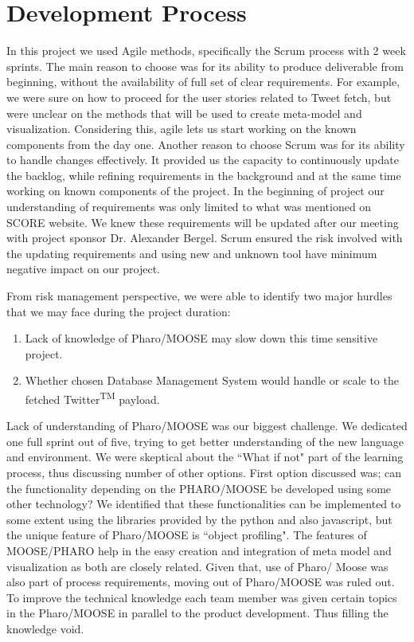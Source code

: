\documentclass[11pt]{article}
\begin{document}
\section{Development Process}

In this project we used Agile methods\cite{AGILEMANIFESTO}, specifically the Scrum process with 2 week sprints\cite{BlackAgilebook}. The main reason to choose was for its ability to produce deliverable from beginning, without the availability of full set of clear requirements. For example, we were sure on how to proceed for the user stories related to Tweet fetch, but were unclear on the methods that will be used to create meta-model and visualization. Considering this, agile lets us start working on the known components from the day one. Another reason to choose Scrum was for its ability to handle changes effectively. It provided us the capacity to continuously update the backlog, while refining requirements in the background and at the same time working on known components of the project. In the beginning of project our understanding of requirements was only limited to what was mentioned on SCORE website. We knew these requirements will be updated after our meeting with project sponsor Dr. Alexander Bergel. Scrum ensured the risk involved with the updating requirements and using new and unknown tool have minimum negative impact on our project. 

From risk management perspective, we were able to identify two major hurdles that we may face during the project duration: 

\begin{enumerate}
\item Lack of knowledge of Pharo/MOOSE may slow down this time sensitive project.
\item Whether chosen Database Management System would handle or scale to the fetched Twitter\textsuperscript{TM} payload.
\end{enumerate}


Lack of understanding of Pharo/MOOSE was our biggest challenge. We dedicated one full sprint out of five, trying to get better understanding of the new language and environment. We were skeptical about the ``What if not" part of the learning process, thus discussing number of other options. First option discussed was; can the functionality depending on the PHARO/MOOSE be developed using some other technology? We identified that these functionalities can be implemented to some extent using the libraries provided by the python and also javascript, but the unique feature of Pharo/MOOSE is ``object profiling". The features of MOOSE/PHARO help in the easy creation and integration of meta model and visualization as both are closely related. Given that, use of Pharo/ Moose was also part of process requirements, moving out of Pharo/MOOSE was ruled out. To improve the technical knowledge each team member was given certain topics in the Pharo/MOOSE in parallel to the product development. Thus filling the knowledge void.
\end{document}

